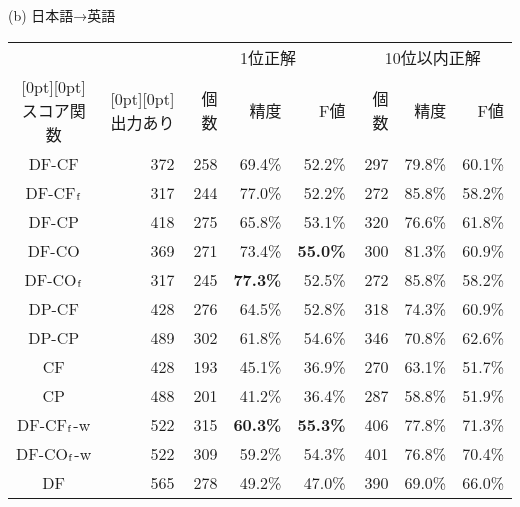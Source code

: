 \documentclass[japanese]{jnlp_1.3a}
\begin{document}
\begin{table}[t]
     \vspace{\baselineskip}
 (b) 日本語→英語
\vspace{4pt}

 \begin{tabular}{|c|r|r|r|r|r|r|r|}
  \hline
  & & \multicolumn{3}{|c|}{1位正解} & \multicolumn{3}{|c|}{10位以内正解}\\
      \cline{3-8}
  \raisebox{0.5\normalbaselineskip}[0pt][0pt]{スコア関数} & \raisebox{0.5\normalbaselineskip}[0pt][0pt]{出力あり} 
	& 個数 & 精度 & F値 & 個数 & 精度 & F値\\
  \hline \hline
  DF-CF     & 372 & 258 & 69.4\% & 52.2\% & 297 & 79.8\% & 60.1\% \\
  DF-CF${\rm _f}$    & 317 & 244 & 77.0\% & 52.2\% & 272 & 85.8\% & 58.2\% \\
  DF-CP     & 418 & 275 & 65.8\% & 53.1\% & 320 & 76.6\% & 61.8\% \\
  DF-CO     & 369 & 271 & 73.4\% & {\bf 55.0\%} & 300 & 81.3\% & 60.9\% \\
  DF-CO${\rm _f}$ & 317 & 245 & {\bf 77.3\%} & 52.5\% & 272 & 85.8\% & 58.2\%\\
  DP-CF     & 428 & 276 & 64.5\% & 52.8\% & 318 & 74.3\% & 60.9\% \\
  DP-CP     & 489 & 302 & 61.8\% & 54.6\% & 346 & 70.8\% & 62.6\% \\
  CF        & 428 & 193 & 45.1\% & 36.9\% & 270 & 63.1\% & 51.7\% \\
  CP        & 488 & 201 & 41.2\% & 36.4\% & 287 & 58.8\% & 51.9\% \\
  \hline            
  DF-CF${\rm _f}$-w  & 522 & 315 & {\bf 60.3\%} & {\bf 55.3\%} & 406 & 77.8\% & 71.3\% \\
  DF-CO${\rm _f}$-w  & 522 & 309 & 59.2\% & 54.3\% & 401 & 76.8\% & 70.4\% \\
  \hline            
  DF        & 565 & 278 & 49.2\% & 47.0\% & 390 & 69.0\% & 66.0\% \\
  \hline
 \end{tabular}
\end{table}
\end{document}
